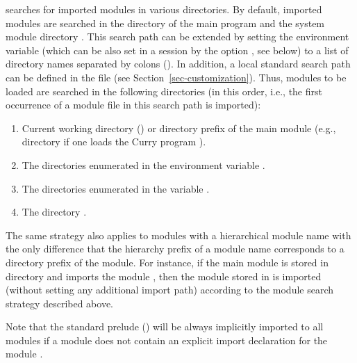 \CYS searches for imported modules in various directories.
By default, imported modules are searched in the directory
of the main program and the system module directory
.
This search path can be extended
by setting the environment variable 
(which can be also set in a \CYS session by the option
,
see below)
to a list of directory names separated by colons (\ccode{:}).
In addition, a local standard search path
can be defined in the  file
(see Section~\ref{sec-customization}).
Thus, modules to be loaded are searched in the following
directories (in this order, i.e., the first occurrence of a module file
in this search path is imported):
\begin{enumerate}
\item Current working directory () or directory prefix
of the main module (e.g., directory 
if one loads the Curry program ).
\item The directories enumerated in the environment variable .
\item The directories enumerated in the  variable
      .
\item The directory .
\end{enumerate}
The same strategy also applies to modules with a hierarchical
module name with the only difference that the hierarchy prefix
of a module name corresponds to a directory prefix of the module.
For instance, if the main module is stored in directory 
and imports the module , then the module stored in
 is imported (without setting
any additional import path) according to the
module search strategy described above.

Note that the standard prelude ()
will be always implicitly imported to all modules if a module
does not contain an explicit import declaration for the module
.


